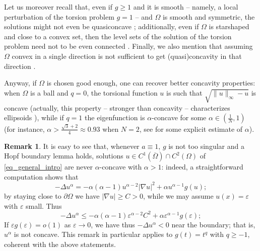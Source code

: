 \documentclass[11pt, reqno]{amsart}
\theoremstyle{definition}
\newtheorem{remark}[lemma]{Remark}
\numberwithin{equation}{section}
\def\eps{\varepsilon}
\def\norm#1{\|#1\|}
\begin{document}
 Let us moreover recall that, even if $g \geq 1$ and it is smooth -- namely, a local perturbation of the torsion problem $g=1$ -- and $\Omega$ is smooth and symmetric, the solutions might not even be quasiconcave \cite{HNS16, AAGS23}; additionally, even if $\Omega$ is starshaped and close to a convex set, then the level sets of the solution of the torsion problem need not to be even connected \cite{GlGr22}. Finally, we also mention that assuming $\Omega$ convex in a single direction is not sufficient to get (quasi)concavity in that direction \cite{Wet11}.

Anyway, if $\Omega$ is chosen good enough, one can recover better concavity properties: when $\Omega$ is a ball and $q=0$, the torsional function $u$ is such that $\sqrt{\norm{u}_{\infty}-u}$ is concave (actually, this property -- stronger than concavity -- characterizes ellipsoids \cite{HNST18}), while if $q=1$ the eigenfunction is $\alpha$-concave for some $\alpha \in (\frac{1}{N},1)$ (for instance, $\alpha >\frac{\sqrt{3}+2}{4}\approx 0.93$ when $N=2$, see \cite{Lind94} for some explicit estimate of $\alpha$). 
\begin{remark}
\label{rem_alpha_mag_1}
It is easy to see that, whenever $a\equiv 1$, $g$ is not too singular and a Hopf boundary lemma holds, solutions $u\in C^1(\overline{\Omega}) \cap C^2(\Omega)$ of \eqref{eq_general_intro} are never $\alpha$-concave with $\alpha>1$: indeed, a straightforward computation shows that
$$-\Delta u^{\alpha} = - \alpha(\alpha-1) u^{\alpha-2} |\nabla u|^2 + \alpha u^{\alpha-1} g(u);$$
by staying close to $\partial \Omega$ we have $|\nabla u| \geq C >0$, while we may assume $u(x)=\eps$ with $\eps$ small. 
Thus
$$-\Delta u^{\alpha} \leq - \alpha(\alpha-1) \eps^{\alpha-2} C^2 + \alpha \eps^{\alpha-1} g(\eps);$$
If $\eps g(\eps) = o(1)$ as $\eps \to 0$, we have thus $-\Delta u^{\alpha}<0$ near the boundary; that is, $u^{\alpha}$ is not concave.
This remark in particular applies to $g(t)=t^q$ with $q \geq -1$, coherent with the above statements.
\end{remark}
\end{document}
